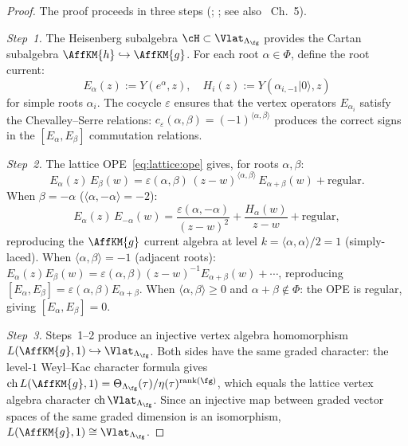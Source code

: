\begin{proof}
The proof proceeds in three steps (\cite{FK80}; \cite{Se81};
see also \cite{Kac}~Ch.~5).

\emph{Step~1.}
The Heisenberg subalgebra $\cH \subset \Vlat_{\Lambda_\fg}$ provides
the Cartan subalgebra $\AffKM{h} \hookrightarrow \AffKM{g}$.
For each root $\alpha \in \Phi$, define the root current:
\[
E_\alpha(z) := Y(e^\alpha, z), \quad
H_i(z) := Y(\alpha_{i,-1}|0\rangle, z)
\]
for simple roots $\alpha_i$. The cocycle $\varepsilon$ ensures that
the vertex operators $E_{\alpha_i}$ satisfy the Chevalley--Serre
relations: $c_\varepsilon(\alpha,\beta) =
(-1)^{\langle\alpha,\beta\rangle}$ produces the correct signs in the
$[E_\alpha, E_\beta]$ commutation relations.

\emph{Step~2.}
The lattice OPE~\eqref{eq:lattice:ope} gives, for roots $\alpha, \beta$:
\[
E_\alpha(z)\, E_\beta(w) = \varepsilon(\alpha,\beta)\,
(z-w)^{\langle\alpha,\beta\rangle}\, E_{\alpha+\beta}(w)
+ \text{regular}.
\]
When $\beta = -\alpha$ ($\langle\alpha,-\alpha\rangle = -2$):
\[
E_\alpha(z)\, E_{-\alpha}(w)
= \frac{\varepsilon(\alpha,-\alpha)}{(z-w)^2} + \frac{H_\alpha(w)}{z-w}
+ \text{regular},
\]
reproducing the $\AffKM{g}$ current algebra at level $k =
\langle\alpha,\alpha\rangle/2 = 1$ (simply-laced). When
$\langle\alpha,\beta\rangle = -1$ (adjacent roots):
$E_\alpha(z) E_\beta(w) = \varepsilon(\alpha,\beta)(z-w)^{-1}
E_{\alpha+\beta}(w) + \cdots$, reproducing $[E_\alpha, E_\beta] =
\varepsilon(\alpha,\beta) E_{\alpha+\beta}$. When
$\langle\alpha,\beta\rangle \geq 0$ and $\alpha+\beta \notin \Phi$:
the OPE is regular, giving $[E_\alpha, E_\beta] = 0$.

\emph{Step~3.}
Steps~1--2 produce an injective vertex algebra homomorphism
$L(\AffKM{g}, 1) \hookrightarrow \Vlat_{\Lambda_\fg}$. Both sides
have the same graded character: the level-$1$ Weyl--Kac character
formula gives $\mathrm{ch}\, L(\AffKM{g}, 1) =
\Theta_{\Lambda_\fg}(\tau) / \eta(\tau)^{\mathrm{rank}(\fg)}$, which
equals the lattice vertex algebra character $\mathrm{ch}\,
\Vlat_{\Lambda_\fg}$. Since an injective map between graded
vector spaces of the same graded dimension is an isomorphism,
$L(\AffKM{g}, 1) \cong \Vlat_{\Lambda_\fg}$.
\end{proof}

